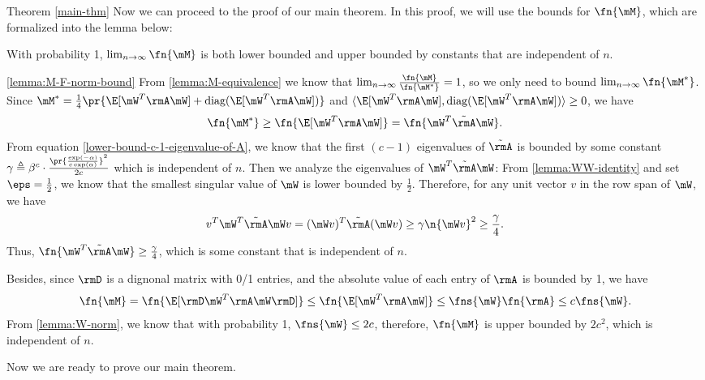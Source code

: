 \begin{proofof}{Theorem \cref{main-thm}}
Now we can proceed to the proof of our main theorem. In this proof, we will use the bounds for $\fn{\mM}$, which are formalized into the lemma below:


\begin{lemma}
\label{lemma:M-F-norm-bound}
With probability 1, $\lim_{n\to\infty}\fn{\mM}$ is both lower bounded and upper bounded by constants that are independent of $n$.
\end{lemma}
\begin{proofof}{\cref{lemma:M-F-norm-bound}}
From \cref{lemma:M-equivalence} we know that $\lim_{n\to\infty}\frac{\fn{\mM}}{\fn{\mM^*}}=1$, so we only need to bound $\lim_{n\to\infty}\fn{\mM^*}$. Since $\mM^*=\frac14\pr{\E[\mW^T\rmA\mW]+\text{diag}(\E[\mW^T\rmA\mW])}$ and $\langle\E[\mW^T\rmA\mW],\text{diag}(\E[\mW^T\rmA\mW])\rangle\geq0$, we have
\begin{equation}
    \fn{\mM^*}\geq\fn{\E[\mW^T\rmA\mW]} = \fn{\mW^T\tilde{\rmA}\mW}.
\end{equation}
From equation \cref{lower-bound-c-1-eigenvalue-of-A}, we know that the first $(c-1)$ eigenvalues of $\tilde{\rmA}$ is bounded by some constant $\gamma\triangleq\beta^c\cdot\frac{\pr{\frac{\exp(-\alpha)}{c\exp(\alpha)}}^2}{2c}$ which is independent of $n$. Then we analyze the eigenvalues of $\mW^T\tilde{\rmA}\mW$: From \cref{lemma:WW-identity} and set $\eps=\frac12$, we know that the smallest singular value of $\mW$ is lower bounded by $\frac12$. Therefore, for any unit vector $v$ in the row span of $\mW$, we have
\begin{equation}
\label{eqn:WAW-lower-bound}
    v^T\mW^T\tilde{\rmA}\mW v = (\mW v)^T\tilde{\rmA}(\mW v) \geq \gamma\n{\mW v}^2 \geq \frac{\gamma}{4}.
\end{equation}
Thus, $\fn{\mW^T\tilde{\rmA}\mW}\geq\frac{\gamma}{4}$, which is some constant that is independent of $n$.

Besides, since $\rmD$ is a dignonal matrix with 0/1 entries, and the absolute value of each entry of $\rmA$ is bounded by 1, we have
\begin{equation}
    \fn{\mM}=\fn{\E[\rmD\mW^T\rmA\mW \rmD]}\leq\fn{\E[\mW^T\rmA\mW]}\leq\fns{\mW}\fn{\rmA}\leq c\fns{\mW}.
\end{equation}
From \cref{lemma:W-norm}, we know that with probability 1, $\fns{\mW}\leq 2c$, therefore, $\fn{\mM}$ is upper bounded by $2c^2$, which is independent of $n$.
\end{proofof}
Now we are ready to prove our main theorem.


\end{proofof}
